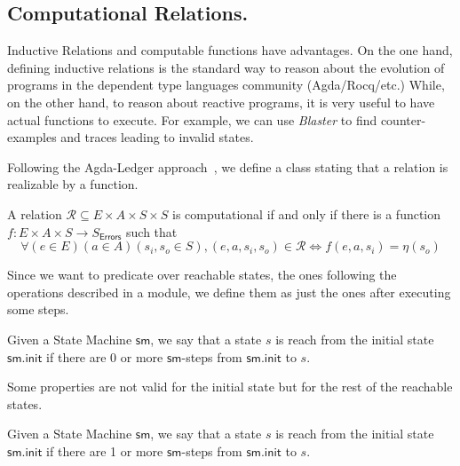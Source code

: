 \subsection{Computational Relations.}\label{sec:computationalrelations}

Inductive Relations and computable functions have advantages.
%
On the one hand, defining inductive relations is the standard way to reason about the evolution
of programs in the dependent type languages community (Agda/Rocq/etc.)
%
While, on the other hand, to reason about reactive programs, it is very useful
to have actual functions to execute.
%
For example, we can use \emph{Blaster} to find counter-examples and traces
leading to invalid states.

Following the Agda-Ledger approach~\cite{Ledger.FMBC2024}, we define a
class stating that a relation is realizable by a function.

\begin{definition}
  A relation \(\mathcal{R} \subseteq E \times A \times S \times S \) is
  computational if and only if there is a function
  \(f : E \times A \times S \to S_{\mathsf{Errors}}\) such that
  \[
    \forall (e \in E) (a \in A) (s_{i}, s_{o} \in S),
    (e, a, s_{i}, s_{o}) \in \mathcal{R}  \iff
    f(e,a,s_{i}) = \eta(s_{o})
  \]
  \label{dfn:computational_relation}
  \leanok
\end{definition}

Since we want to predicate over reachable states, the ones following the
operations described in a module, we define them as just the ones after
executing some steps.

\begin{definition}
  \leanok
  \label{dfn:ComputationalRelation.StateMachine.FromInit}
  Given a State Machine \(\mathsf{sm}\), we say that a state \(s\) is reach from
the initial state \(\mathsf{sm.init}\) if there are 0 or more \(\mathsf{sm}\)-steps from
\(\mathsf{sm.init}\) to \(s\).
  \end{definition}

Some properties are not valid for the initial state but for the rest of the
reachable states.

\begin{definition}
  \leanok
  \label{dfn:ComputationalRelation.StateMachine.AfterInit}
  Given a State Machine \(\mathsf{sm}\), we say that a state \(s\) is reach from
the initial state \(\mathsf{sm.init}\) if there are 1 or more \(\mathsf{sm}\)-steps from
\(\mathsf{sm.init}\) to \(s\).
  \end{definition}


